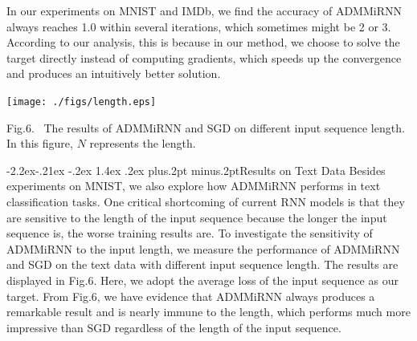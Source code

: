 \documentclass[twoside]{article}
\makeatletter
\def\subsubsection{\@startsection{subsubsection}{3}{\z@}%
 {-2.2ex\@plus -.21ex \@minus -.2ex}%
 {1.4ex \@plus.2ex}
{\normalfont\normalsize\protect\baselineskip=12pt plus.2pt minus.2pt\sl}}
\makeatother
\begin{document}
\begin{multicols}{2}
In our experiments on MNIST and IMDb, we find the accuracy of ADMMiRNN always reaches 1.0 within several iterations, which sometimes might be 2 or 3. According to our analysis, this is because in our method, we choose to solve the target directly instead of computing gradients, which speeds up the convergence and produces an intuitively better solution. 

\begin{center}
\texttt{[image: ./figs/length.eps]}\\
\vspace{2mm}
\parbox[c]{8.3cm}{\footnotesize{Fig.6.~}  The results of ADMMiRNN and SGD on different input sequence length. In this figure, $N$ represents the length.}%
 \label{fig:length}
\end{center}
\subsubsection{Results on Text Data}
Besides experiments on MNIST, we also explore how ADMMiRNN performs in text classification tasks.
One critical shortcoming of current RNN models is that they are sensitive to the length of the input sequence because the longer the input sequence is, the worse training results are. To investigate the sensitivity of ADMMiRNN to the input length, we measure the performance of ADMMiRNN and SGD on the text data with different input sequence length. The results are displayed in Fig.6. Here, we adopt the average loss of the input sequence as our target. From Fig.6, we have evidence that ADMMiRNN always produces a remarkable result and is nearly immune to the length, which performs much more impressive than SGD regardless of the length of the input sequence.  


\end{multicols}
\end{document}
